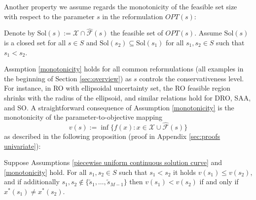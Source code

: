 \documentclass[mnsc,blindrev]{informs4} %
\begin{document}
Another property we assume regards the monotonicity of the feasible set size with respect to the parameter $s$ in the reformulation $OPT(s)$:
\begin{assumption}\label{monotonicity}%
Denote by $\mathrm{Sol}(s):=\mathcal X\cap \hat{\mathcal F}(s)$ the feasible set of $OPT(s)$. Assume $\mathrm{Sol}(s)$ is a closed set for all $s\in S$ and $\mathrm{Sol}(s_2)\subseteq \mathrm{Sol}(s_1)$ for all $s_1,s_2\in S$ such that $s_1<s_2$.
\end{assumption}
Assmption \ref{monotonicity} holds for all common reformulations (all examples in the beginning of Section \ref{sec:overview}) as $s$ controls the conservativeness level. For instance, in RO with ellipsoidal uncertainty set, the RO feasible region shrinks with the radius of the ellipsoid, and similar relations hold for DRO, SAA, and SO. A straightforward consequence of Assumption \ref{monotonicity} is the monotonicity of the parameter-to-objective mapping
\begin{equation*}
v(s):=\inf\{f(x):x\in \mathcal X\cup \hat{\mathcal F}(s)\}
\end{equation*}
as described in the following proposition (proof in Appendix \ref{sec:proofs univariate}):
\begin{proposition}\label{monotonic objective value}
Suppose Assumptions \ref{piecewise uniform continuous solution curve} and \ref{monotonicity} hold. For all $s_1,s_2\in S$ such that $s_1<s_2$ it holds $v(s_1)\leq v(s_2)$, and if additionally $s_1,s_2\notin \{\tilde s_1,\ldots,\tilde s_{M-1}\}$ then $v(s_1)< v(s_2)$ if and only if $x^*(s_1)\neq x^*(s_2)$.
\end{proposition}
\end{document}
